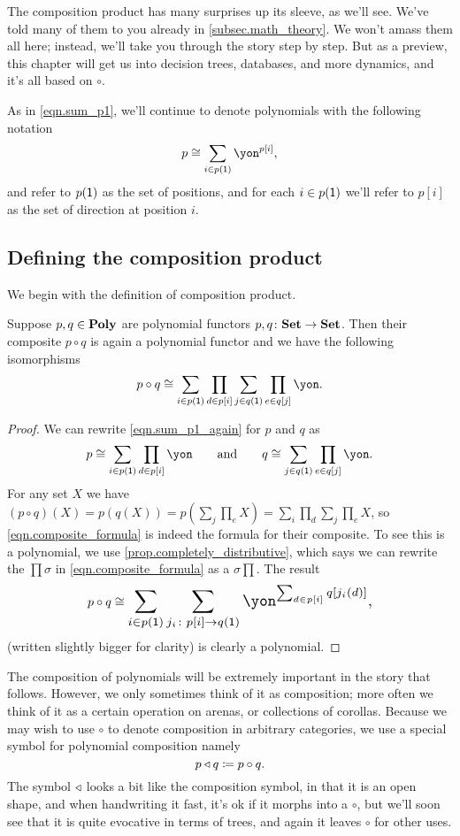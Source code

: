 \documentclass[DynamicalBook]{subfiles}
\begin{document}
The composition product has many surprises up its sleeve, as we'll see. We've told many of them to you already in \cref{subsec.math_theory}. We won't amass them all here; instead, we'll take you through the story step by step. But as a preview, this chapter will get us into decision trees, databases, and more dynamics, and it's all based on $\circ$.

As in \cref{eqn.sum_p1}, we'll continue to denote polynomials with the following notation
\begin{equation}\label{eqn.sum_p1_again}
p\cong\sum_{i\in p(\1)}\yon^{p[i]},
\end{equation}
and refer to $p(\textsf{1})$ as the set of positions, and for each $i\in p(\textsf{1})$ we'll refer to $p[i]$ as the set of direction at position $i$.

\subsection{Defining the composition product}
We begin with the definition of composition product.

\begin{proposition}\label{prop.poly_closed_comp}
Suppose $p,q\in\textbf{Poly}$ are polynomial functors $p,q\colon\textbf{Set}\to\textbf{Set}$. Then their composite $p\circ q$ is again a polynomial functor and we have the following isomorphisms
\[
p\circ q\cong\sum_{i\in p(\1)}\prod_{d\in p[i]}\sum_{j\in q(\1)}\prod_{e\in q[j]}\yon.
\]
\end{proposition}
\begin{proof}
We can rewrite \cref{eqn.sum_p1_again} for $p$ and $q$ as
\[
p\cong\sum_{i\in p(\1)}\prod_{d\in p[i]}\yon
\qqand
q\cong\sum_{j\in q(\1)}\prod_{e\in q[j]}\yon.
\]
For any set $X$ we have $(p\circ q)(X)=p(q(X))=p(\sum_j\prod_e X)=\sum_i\prod_d\sum_j\prod_eX$, so \eqref{eqn.composite_formula} is indeed the formula for their composite. To see this is a polynomial, we use \cref{prop.completely_distributive}, which says we can rewrite the $\prod\sigma$ in \eqref{eqn.composite_formula} as a $\sigma\prod$. The result 
\begin{equation}\label{eqn.composition_formula_sums_first}
  p\circ q\cong
  \scalebox{1.3}{$\displaystyle
  \sum_{i\in p(\1)}\sum_{j_i\colon p[i]\to q(\1)}\yon^{\sum_{d\in p[i]}q[j_i(d)]},$}
\end{equation}
(written slightly bigger for clarity) is clearly a polynomial.
\end{proof}

The composition of polynomials will be extremely important in the story that follows. However, we only sometimes think of it as composition; more often we think of it as a certain operation on arenas, or collections of corollas. Because we may wish to use $\circ$ to denote composition in arbitrary categories, we use a special symbol for polynomial composition namely
\[
p\mathbin{\triangleleft} q\coloneqq p\circ q.
\]
The symbol $\mathbin{\triangleleft}$ looks a bit like the composition symbol, in that it is an open shape, and when handwriting it fast, it's ok if it morphs into a $\circ$, but we'll soon see that it is quite evocative in terms of trees, and again it leaves $\circ$ for other uses.
\end{document}
